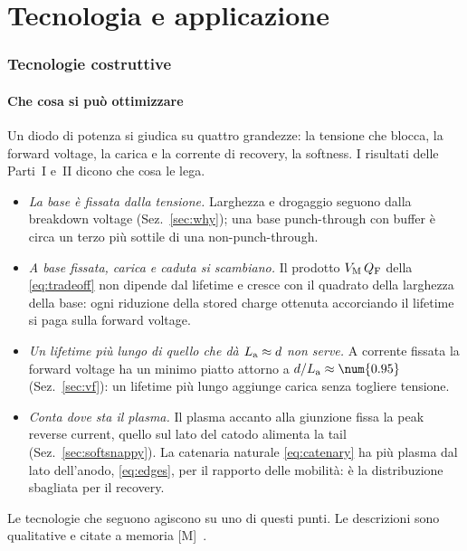\documentclass[10pt,a4paper]{scrartcl}
\let\newcommand\pdvaluedefine
\newcommand{\La}{L_\mathrm{a}}
\newcommand{\VM}{V_\mathrm{M}}
\newcommand{\QF}{Q_\mathrm{F}}
\newcommand{\Pp}{p\textsuperscript{+}}
\newcommand{\Nm}{n\textsuperscript{--}}
\begin{document}
\part{Tecnologia e applicazione}

\section{Tecnologie costruttive}
\label{sec:technology}
\subsection{Che cosa si può ottimizzare}
Un diodo di potenza si giudica su quattro grandezze: la tensione che blocca, la forward voltage, la carica e la corrente di recovery, la softness. I risultati delle Parti~I e~II dicono che cosa le lega.
\begin{itemize}
\item \emph{La base è fissata dalla tensione.} Larghezza e drogaggio seguono dalla breakdown voltage (Sez.~\ref{sec:why}); una base punch-through con buffer è circa un terzo più sottile di una non-punch-through.
\item \emph{A base fissata, carica e caduta si scambiano.} Il prodotto $\VM\,\QF$ della \eqref{eq:tradeoff} non dipende dal lifetime e cresce con il quadrato della larghezza della base: ogni riduzione della stored charge ottenuta accorciando il lifetime si paga sulla forward voltage.
\item \emph{Un lifetime più lungo di quello che dà $\La \approx d$ non serve.} A corrente fissata la forward voltage ha un minimo piatto attorno a $d/\La \approx \num{\pdVfMinBeta}$ (Sez.~\ref{sec:vf}): un lifetime più lungo aggiunge carica senza togliere tensione.
\item \emph{Conta dove sta il plasma.} Il plasma accanto alla giunzione \Pp\Nm{} fissa la peak reverse current, quello sul lato del catodo alimenta la tail (Sez.~\ref{sec:softsnappy}). La catenaria naturale \eqref{eq:catenary} ha più plasma dal lato dell'anodo, \eqref{eq:edges}, per il rapporto delle mobilità: è la distribuzione sbagliata per il recovery.
\end{itemize}
Le tecnologie che seguono agiscono su uno di questi punti. Le descrizioni sono qualitative e citate a memoria [M]~\cite{lutz,baliga}.
\end{document}
